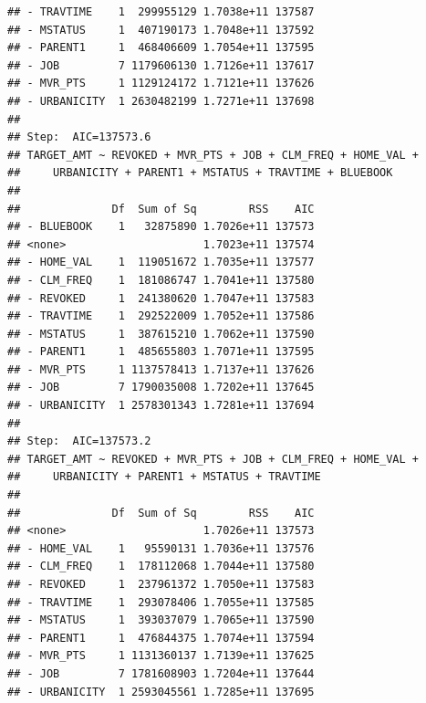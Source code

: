\documentclass[]{article}
\begin{document}
\begin{verbatim}
## - TRAVTIME    1  299955129 1.7038e+11 137587
## - MSTATUS     1  407190173 1.7048e+11 137592
## - PARENT1     1  468406609 1.7054e+11 137595
## - JOB         7 1179606130 1.7126e+11 137617
## - MVR_PTS     1 1129124172 1.7121e+11 137626
## - URBANICITY  1 2630482199 1.7271e+11 137698
## 
## Step:  AIC=137573.6
## TARGET_AMT ~ REVOKED + MVR_PTS + JOB + CLM_FREQ + HOME_VAL + 
##     URBANICITY + PARENT1 + MSTATUS + TRAVTIME + BLUEBOOK
## 
##              Df  Sum of Sq        RSS    AIC
## - BLUEBOOK    1   32875890 1.7026e+11 137573
## <none>                     1.7023e+11 137574
## - HOME_VAL    1  119051672 1.7035e+11 137577
## - CLM_FREQ    1  181086747 1.7041e+11 137580
## - REVOKED     1  241380620 1.7047e+11 137583
## - TRAVTIME    1  292522009 1.7052e+11 137586
## - MSTATUS     1  387615210 1.7062e+11 137590
## - PARENT1     1  485655803 1.7071e+11 137595
## - MVR_PTS     1 1137578413 1.7137e+11 137626
## - JOB         7 1790035008 1.7202e+11 137645
## - URBANICITY  1 2578301343 1.7281e+11 137694
## 
## Step:  AIC=137573.2
## TARGET_AMT ~ REVOKED + MVR_PTS + JOB + CLM_FREQ + HOME_VAL + 
##     URBANICITY + PARENT1 + MSTATUS + TRAVTIME
## 
##              Df  Sum of Sq        RSS    AIC
## <none>                     1.7026e+11 137573
## - HOME_VAL    1   95590131 1.7036e+11 137576
## - CLM_FREQ    1  178112068 1.7044e+11 137580
## - REVOKED     1  237961372 1.7050e+11 137583
## - TRAVTIME    1  293078406 1.7055e+11 137585
## - MSTATUS     1  393037079 1.7065e+11 137590
## - PARENT1     1  476844375 1.7074e+11 137594
## - MVR_PTS     1 1131360137 1.7139e+11 137625
## - JOB         7 1781608903 1.7204e+11 137644
## - URBANICITY  1 2593045561 1.7285e+11 137695
\end{verbatim}
\end{document}
